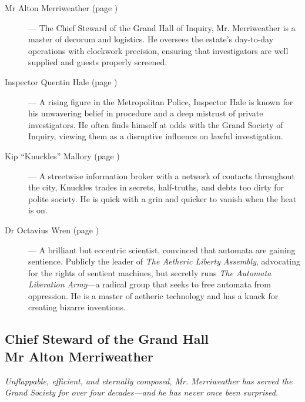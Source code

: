 \begin{description}
    \item[Mr Alton Merriweather (page \pageref{npc:alton-merriweather})] --- The Chief Steward of the Grand Hall of Inquiry, Mr. Merriweather is a master of decorum and logistics. He oversees the estate’s day-to-day operations with clockwork precision, ensuring that investigators are well supplied and guests properly screened.

    \item[Inspector Quentin Hale (page \pageref{npc:inspector-hale})] --- A rising figure in the Metropolitan Police, Inspector Hale is known for his unwavering belief in procedure and a deep mistrust of private investigators. He often finds himself at odds with the Grand Society of Inquiry, viewing them as a disruptive influence on lawful investigation.
    
    \item[Kip “Knuckles” Mallory (page \pageref{npc:kip-mallory})] --- A streetwise information broker with a network of contacts throughout the city, Knuckles trades in secrets, half-truths, and debts too dirty for polite society. He is quick with a grin and quicker to vanish when the heat is on.

    \item[Dr Octavius Wren (page \pageref{npc:octavius-wren})] --- A brilliant but eccentric scientist, convinced that automata are gaining sentience. Publicly the leader of \emph{The Aetheric Liberty Assembly}, advocating for the rights of sentient machines, but secretly runs \emph{The Automata Liberation Army}—a radical group that seeks to free automata from oppression. He is a master of aetheric technology and has a knack for creating bizarre inventions.

\end{description}

\clearpage
    \subsection{{\small Chief Steward of the Grand Hall}\\ Mr Alton Merriweather}
    \label{npc:alton-merriweather}

        \emph{Unflappable, efficient, and eternally composed, Mr. Merriweather has served the Grand Society for over four decades—and he has never once been surprised.}
        \vspace{.5\baselineskip}
      
